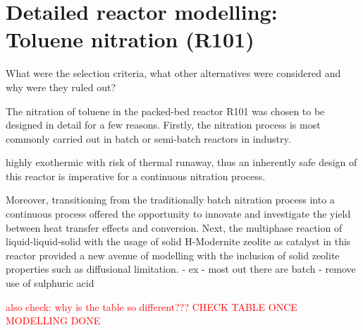 \section{Detailed reactor modelling: Toluene nitration (R101)}
What were the selection criteria, what other alternatives were considered and why were they ruled out? 

The nitration of toluene in the packed-bed reactor R101 was chosen to be designed in detail for a few reasons. Firstly, the nitration process is most commonly carried out in batch or semi-batch reactors in industry.  

highly exothermic with risk of thermal runaway, thus an inherently safe design of this reactor is imperative for a continuous nitration process. 

Moreover, transitioning from the traditionally batch nitration process into a continuous process offered the opportunity to innovate and investigate the yield between heat transfer effects and conversion. Next, the multiphase reaction of liquid-liquid-solid with the usage of solid H-Modernite zeolite as catalyst in this reactor provided a new avenue of modelling with the inclusion of solid zeolite properties such as diffusional limitation. 
- ex
- most out there are batch
- remove use of sulphuric acid

\textcolor{red}{also check: why is the table so different???}
\textcolor{red}{CHECK TABLE ONCE MODELLING DONE}

